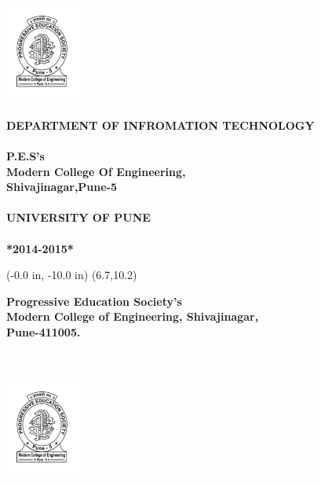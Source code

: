 \documentclass[12pt,a4paper]{article}
\begin{document}
	\begin{center}
\includegraphics[width=2.5cm]{modernlogo}
\end{center}
	\begin{center}
	
	
\textbf {DEPARTMENT OF INFROMATION TECHNOLOGY }\\
\\
\textbf {P.E.S's}\\
\textbf{ Modern College Of Engineering,} \\
\textbf{Shivajinagar,Pune-5}\\
\\
\textbf{UNIVERSITY OF PUNE}\\
\\
\textbf{*2014-2015*}\\
\end{center}

\newpage
\pagestyle{empty}
	\thisfancyput(-0.0 in, -10.0 in) {\setlength{\unitlength}{1 in}\framebox(6.7,10.2)}

\vspace{0.2in}
\begin{center}
\textbf{\large{Progressive Education Society's}}\\
\textbf{\large{Modern College of Engineering, Shivajinagar,}}\\
\textbf{\large{Pune-411005.}}\\
\\
\\
\vspace{0.2in}
\end{center}

	\begin{center}
\includegraphics[width=2.5cm]{modernlogo}
\end{center}
\end{document}
